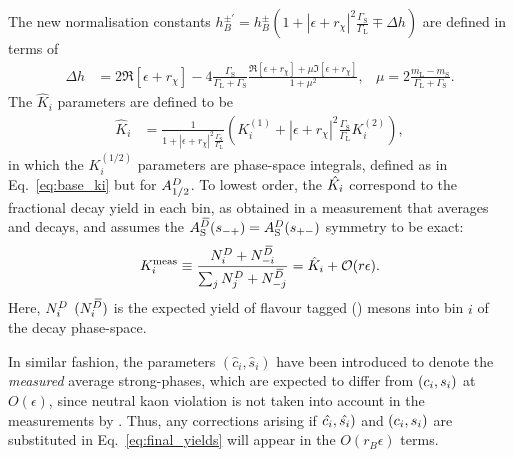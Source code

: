 The new normalisation constants $h_B^{\pm'}=h_B^{\pm}(1+|\epsilon+r_\chi|^2\frac{\Gamma_\text{S}}{\Gamma_\text{L}}\mp\Delta h)$ are defined in terms of
\begin{align}
        \Delta h &= 2\Re[\epsilon+r_\chi] 
    -4\frac{\Gamma_\text{S}}{\Gamma_\text{L}+\Gamma_\text{S}}\frac{\Re[\epsilon+r_\chi] + \mu \Im[\epsilon+r_\chi] }
    {1+\mu^2}, &
    \mu = 2 \frac{m_\text{L}-m_\text{S}}{\Gamma_\text{L}+\Gamma_\text{S}}.
\end{align}
The $\hat K_i$ parameters are defined to be
\begin{align}\label{eq:hat_Ki}
\hat K_i &= \frac{1}{1+|\epsilon+r_\chi|^2\frac{\Gamma_\text{S}}{\Gamma_\text{L}}}\left(K_i^{(1)}+|\epsilon+r_\chi|^2\frac{\Gamma_\text{S}}{\Gamma_\text{L}}K_i^{(2)}\right),
\end{align}
in which the $K^{(1/2)}_i$ parameters are phase-space integrals, defined as in Eq.~\eqref{eq:base_ki} but for $A^{D}_{1/2}$. To lowest order, the $\hat {K_i}$ correspond to the fractional \Dz decay yield in each bin, as obtained in a measurement that averages \Dz and \Dzb decays, and assumes the $A_{\rm S}^{{\kern 0.18em\overline{\kern -0.18em D}}}(s_{-+})=A_{\rm S}^{D}(s_{+-})$ symmetry to be exact:
\begin{align}\label{eq:K_meas}
  K_i^\text{meas}\equiv \frac{{N^{D}_i + N^{\kern 0.18em\overline{\kern -0.18em D}}_{-i}}}{{\sum_j N^{D}_j +N^{\kern 0.18em\overline{\kern -0.18em D}}_{-j}}} = \hat K_i + \mathcal O(r\epsilon).
 \end{align}Here, $N^{D}_i$ $(N^{\kern 0.18em\overline{\kern -0.18em D}}_i)$ is the expected yield of flavour tagged \Dz (\Dzb) mesons into bin $i$ of the \D decay phase-space. 

In similar fashion, the parameters $(\hat c_i, \hat s_i)$ have been introduced to denote the \emph{measured} average strong-phases, which are expected to differ from $(c_i,s_i)$ at $O(\epsilon)$, since neutral kaon \CP violation is not taken into account in the measurements by \cleo. Thus, any corrections arising if $\hat {c_i}, \hat {s_i})$ and $(c_i, s_i)$ are substituted in Eq.~\eqref{eq:final_yields} will appear in the $O(r_B\epsilon)$ terms.



